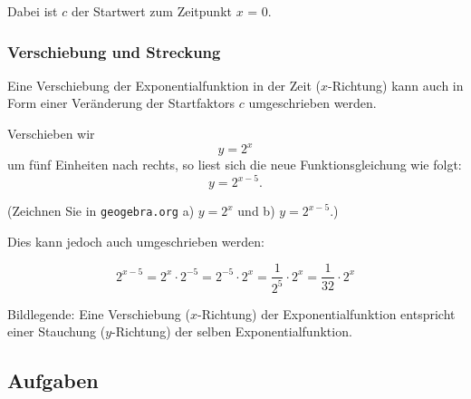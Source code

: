 \begin{center}\end{center}

Dabei ist $c$ der Startwert zum Zeitpunkt $x$ = 0.

\newpage



\subsubsection{Verschiebung und Streckung}

Eine Verschiebung der Exponentialfunktion in der Zeit ($x$-Richtung) kann auch in Form einer Veränderung der Startfaktors $c$ umgeschrieben werden.

Verschieben wir \zB $$y=2^x$$ um fünf Einheiten nach rechts, so liest sich die neue Funktionsgleichung wie folgt:
$$y=2^{x-5}.$$

(Zeichnen Sie in \texttt{geogebra.org} a) $y=2^x$ und b) $y=2^{x-5}$.)

Dies kann jedoch auch umgeschrieben werden:

$$2^{x-5} = 2^x \cdot{} 2^{-5} = 2^{-5} \cdot{} 2^x = \frac{1}{2^5} \cdot{} 2^x =
\frac{1}{32}\cdot{}2^x$$

Bildlegende: Eine Verschiebung ($x$-Richtung) der Exponentialfunktion entspricht einer Stauchung ($y$-Richtung) der selben Exponentialfunktion.



\subsection*{Aufgaben}
\newpage
